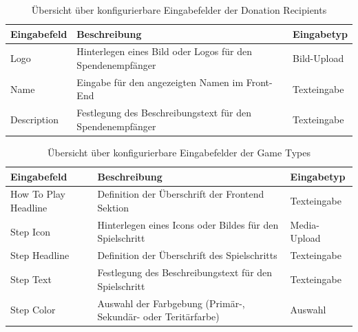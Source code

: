 \documentclass[
	ngerman,
	BCOR=8mm,
	headings=normal,
	parskip=half,
	headsepline,
	automark,
	listof=totoc,
	bibliography=totoc,
]{scrreprt}
\begin{document}
\begin{table}[h]
    \centering
    \renewcommand{\arraystretch}{1.3}
    \begin{tabular}{|p{3cm}|p{6cm}|p{5cm}|}
        \hline
        \textbf{Eingabefeld} & \textbf{Beschreibung} & \textbf{Eingabetyp} \\
        \hline
        Logo & Hinterlegen eines Bild oder Logos für den Spendenempfänger & Bild-Upload \\
        \hline
        Name & Eingabe für den angezeigten Namen im Front-End & Texteingabe \\
        \hline
        Description & Festlegung des Beschreibungstext für den Spendenempfänger  & Texteingabe \\
        \hline
    \end{tabular}
    \caption{Übersicht über konfigurierbare Eingabefelder der Donation Recipients}
    \label{tab:eingabefelder_donation_recipients}
\end{table}

\begin{table}[h]
    \centering
    \renewcommand{\arraystretch}{1.3}
    \begin{tabular}{|p{3cm}|p{6cm}|p{5cm}|}
        \hline
        \textbf{Eingabefeld} & \textbf{Beschreibung} & \textbf{Eingabetyp} \\
        \hline
        How To Play Headline & Definition der Überschrift der Frontend Sektion & Texteingabe \\
        \hline
        Step Icon & Hinterlegen eines Icons oder Bildes für den Spielschritt & Media-Upload \\
        \hline
        Step Headline & Definition der Überschrift des Spielschritts & Texteingabe \\
        \hline
        Step Text & Festlegung des Beschreibungstext für den Spielschritt  & Texteingabe \\
        \hline
        Step Color & Auswahl der Farbgebung (Primär-, Sekundär- oder Teritärfarbe)  & Auswahl \\
        \hline
    \end{tabular}
    \caption{Übersicht über konfigurierbare Eingabefelder der Game Types}
    \label{tab:eingabefelder_game_types}
\end{table}
\end{document}
